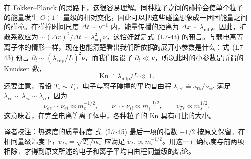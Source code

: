在 Fokker--Planck 的思路下，这很容易理解。同种粒子之间的碰撞会使单个粒子的能量发生 $O(1)$ 量级的相对变化，因此可以把这些碰撞想象成一团团能量之间的碰撞。在碰撞时间尺度 $\Delta t\sim\nu^{-1}$ 内，能量传播的距离为 $\Delta x\sim\lambda_{\mathrm{mfp}}$。因此，扩散系数应为 $\sim(\Delta x)^2/\Delta t\sim\lambda_{\mathrm{mfp}}^2\nu$，这恰好就是式~(L7-43) 的预言。与弱电离等离子体的情形一样，现在也能清楚看出我们所依据的展开小参数是什么：式~(L7-43) 预言 $\partial_t\sim(\lambda_{\mathrm{mfp}}/L)^2\nu$，而我们假设了 $\partial_t\ll\nu$，所以此时的小参数是所谓的 Knudsen 数，
\begin{equation}
\mathrm{Kn}\doteq\lambda_{\mathrm{mfp}}/L\ll1.
\tag{L7-44}\label{eq:L7:44}
\end{equation}
还要注意，假设 $T_e\sim T_i$，电子与离子碰撞的平均自由程 $\lambda_{ss'}\doteq v_{Ts}/\nu_{ss'}$ 满足 $\lambda_{ee}\sim\lambda_{ei}\sim\lambda_{ii}$，因为
\begin{equation}
\nu_{ee}\sim\nu_{ei}\propto m_e^{-1/2},\qquad
\nu_i\sim\nu_{ii}\propto m_i^{-1/2},\qquad
v_{Ts}\propto m_s^{1/2}.
\tag{L7-45}\label{eq:L7:45}
\end{equation}
这意味着，在完全电离等离子体中，各种粒子的 $\mathrm{Kn}$ 具有可比的大小。
\begin{correction}{译者校注：热速度的质量标度}
式~(L7-45) 最后一项的指数 $+1/2$ 按原文保留。在相同量级温度下，$v_{Ts}=\sqrt{T_s/m_s}$ 应满足 $v_{Ts}\propto m_s^{-1/2}$。用这一正确标度与前两项相除，才得到原文所述的电子和离子平均自由程同量级的结论。
\end{correction}
